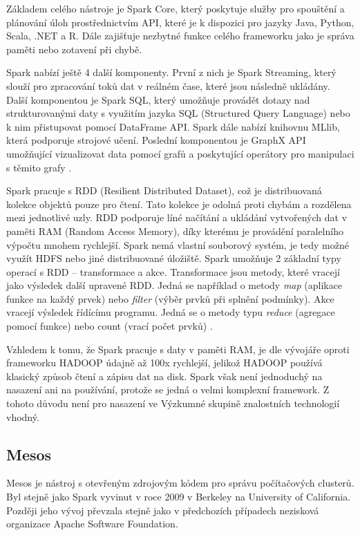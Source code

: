Základem celého nástroje je Spark Core, který poskytuje služby pro spouštění a plánování úloh prostřednictvím API, které je k dispozici pro jazyky Java, Python, Scala, .NET a R. Dále zajišťuje nezbytné funkce celého frameworku jako je správa paměti nebo zotavení při chybě.

Spark nabízí ještě 4 další komponenty. První z nich je Spark Streaming, který slouží pro zpracování toků dat v reálném čase, které jsou následně ukládány. Další komponentou je Spark SQL, který umožňuje provádět dotazy nad strukturovanými daty s využitím jazyka SQL (Structured Query Language) nebo k nim přistupovat pomocí DataFrame API.  Spark dále nabízí knihovnu MLlib, která podporuje strojové učení. Poslední komponentou je GraphX API umožňující vizualizovat data pomocí grafů a poskytující operátory pro manipulaci s těmito grafy \cite{existTools_Spark_components}.


Spark pracuje s RDD (Resilient Distributed Dataset), což je distribuovaná kolekce objektů pouze pro čtení. Tato kolekce je odolná proti chybám a rozdělena mezi jednotlivé uzly. RDD podporuje líné načítání a ukládání vytvořených dat v paměti RAM (Random Access Memory), díky kterému je provádění paralelního výpočtu mnohem rychlejší. Spark nemá vlastní souborový systém, je tedy možné využít HDFS nebo jiné distribuované úložiště. Spark umožňuje 2 základní typy operací s RDD -- transformace a akce. Transformace jsou metody, které vracejí jako výsledek další upravené RDD. Jedná se například o metody \textit{map} (aplikace funkce na každý prvek) nebo \textit{filter} (výběr prvků při splnění podmínky). Akce vracejí výsledek řídícímu programu. Jedná se o metody typu \textit{reduce} (agregace pomocí funkce) nebo count (vrací počet prvků) \cite{existTools_Spark_RDD}.

Vzhledem k tomu, že Spark pracuje s daty v paměti RAM, je dle vývojáře oproti frameworku HADOOP údajně až 100x rychlejší, jelikož HADOOP používá klasický způsob čtení a zápisu dat na disk. Spark však není jednoduchý na nasazení ani na používání, protože se jedná o velmi komplexní framework. Z tohoto důvodu není pro nasazení ve Výzkumné skupině znalostních technologií vhodný.

\subsection*{Mesos}

Mesos je nástroj s otevřeným zdrojovým kódem pro správu počítačových clusterů. Byl stejně jako Spark vyvinut v roce 2009 v Berkeley na University of California. Později jeho vývoj převzala stejně jako v předchozích případech nezisková organizace Apache Software Foundation.

